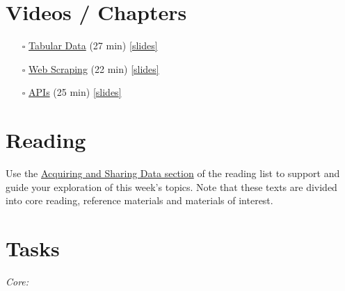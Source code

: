 \documentclass[
  letterpaper,
  DIV=11,
  numbers=noendperiod]{scrreprt}
\begin{document}
\section*{Videos / Chapters}\label{videos-chapters-1}


\begin{itemize}
\item[$\square$]
  \href{https://imperial.cloud.panopto.eu/Panopto/Pages/Viewer.aspx?id=d80e9045-22e7-4a0e-a0fc-af8100d3e727}{Tabular
  Data} (27 min)
  \href{https://github.com/zakvarty/effective-data-science-slides-2022/raw/main/02-01-tabular-data-and-csvs/02-01-tabular-data.pdf}{{[}slides{]}}
\item[$\square$]
  \href{https://imperial.cloud.panopto.eu/Panopto/Pages/Viewer.aspx?id=239ba39e-8a06-4e7b-a6c1-af7200f91d2b}{Web
  Scraping} (22 min)
  \href{https://github.com/zakvarty/effective-data-science-slides-2022/raw/main/02-02-webscraping/02-02-web-scraping.pdf}{{[}slides{]}}
\item[$\square$]
  \href{https://imperial.cloud.panopto.eu/Panopto/Pages/Viewer.aspx?id=e1ed8e4f-cbaa-40c2-8c44-af7200ee2e9f}{APIs}
  (25 min)
  \href{https://github.com/zakvarty/effective-data-science-slides-2022/raw/main/02-03-apis/02-03-apis.pdf}{{[}slides{]}}
\end{itemize}

\section*{Reading}\label{reading-1}


Use the \hyperref[data-reading]{Acquiring and Sharing Data section} of
the reading list to support and guide your exploration of this week's
topics. Note that these texts are divided into core reading, reference
materials and materials of interest.

\section*{Tasks}\label{tasks-1}


\emph{Core:}
\end{document}
